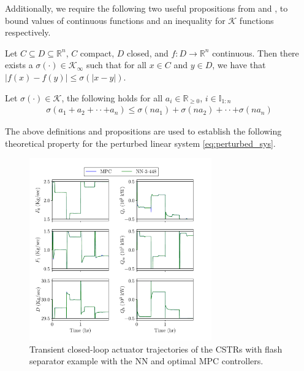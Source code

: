 \documentclass[preprint,5p, twocolumn, authoryear]{elsarticle}
\newcommand{\bbR}{\mathbb{R}}
\newcommand{\bbI}{\mathbb{I}}
\begin{document}
Additionally, we require the following two 
useful propositions from 
\cite*{allan:bates:risbeck:rawlings:2017} and 
\cite*{rawlings:ji:2012},
to bound values of continuous functions and an
inequality for $\mathcal{K}$ functions respectively.

\begin{prop} \label{prop:continuous_funcs}
    Let $C \subseteq D \subseteq \bbR^n$, $C$ compact, 
    $D$ closed, and $f : D \rightarrow \bbR^n$ continuous.  
    Then there exists a $\sigma(\cdot) \in \mathcal{K}_{\infty}$
    such that for all $x \in C$ and $y \in D$, we have that 
    $\vert f(x) - f(y) \vert \leq \sigma(\vert x-y \vert)$.
\end{prop}
    
\begin{prop} \label{prop:Kfunction_inequality}
    Let $\sigma(\cdot) \in \mathcal{K}$, the following holds 
    for all $a_i \in \bbR_{\geq 0}$, $i \in \bbI_{1:n}$ 
    \begin{align*}
        \sigma(a_1 + a_2 + \cdot \cdot + a_n) \leq \sigma(na_1) + 
        \sigma(na_2) + \cdot \cdot + \sigma(na_n)
    \end{align*}    
\end{prop}

The above definitions and propositions 
are used to establish the 
following theoretical property for the perturbed
linear system \ref{eq:perturbed_sys}.

\begin{figure}[!h]
    \centering
	\includegraphics[page=1, 
		width=0.7\textwidth, 
		height=0.5\textheight]{cstrs_comparision_plots.pdf}
    \caption{Transient closed-loop actuator trajectories of the CSTRs with 
    flash separator example with the NN and optimal MPC controllers.}  
    \label{fig:cl_cstrs_inputs}
\end{figure}
\end{document}
